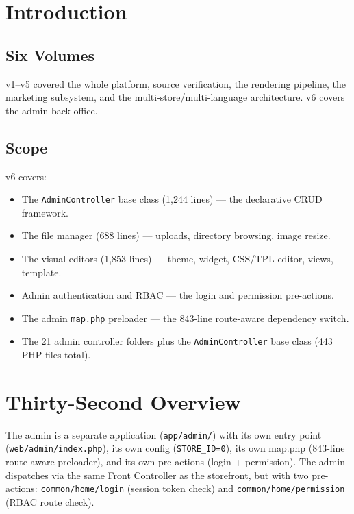 \documentclass[11pt,a4paper]{article}
\begin{document}
\section{Introduction}\label{sec:intro}

\subsection{Six Volumes}

v1--v5 covered the whole platform, source verification, the rendering
pipeline, the marketing subsystem, and the multi-store/multi-language
architecture. v6 covers the admin back-office.

\subsection{Scope}

v6 covers:
\begin{itemize}[leftmargin=1.6em,itemsep=2pt]
  \item The \texttt{AdminController} base class (1,244 lines) --- the
        declarative CRUD framework.
  \item The file manager (688 lines) --- uploads, directory browsing,
        image resize.
  \item The visual editors (1,853 lines) --- theme, widget, CSS/TPL
        editor, views, template.
  \item Admin authentication and RBAC --- the login and permission
        pre-actions.
  \item The admin \texttt{map.php} preloader --- the 843-line route-aware
        dependency switch.
  \item The 21 admin controller folders plus the \texttt{AdminController} base class (443 PHP files total).
\end{itemize}

\section{Thirty-Second Overview}\label{sec:overview}

The admin is a separate application (\texttt{app/admin/}) with its own
entry point (\texttt{web/admin/index.php}), its own config
(\texttt{STORE\_ID=0}), its own map.php (843-line route-aware
preloader), and its own pre-actions (login + permission). The admin
dispatches via the same Front Controller as the storefront, but with
two pre-actions: \texttt{common/home/login} (session token check) and
\texttt{common/home/permission} (RBAC route check).
\end{document}
